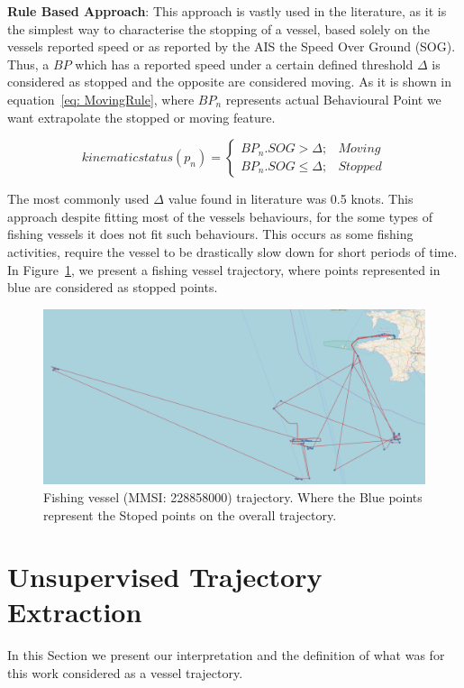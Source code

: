 \textbf{Rule Based Approach}:
This approach is vastly used in the literature, as it is the simplest way to characterise the stopping of a vessel, based solely on the vessels reported speed or as reported by the AIS the Speed Over Ground (SOG). Thus, a $BP$ which has a reported speed under a certain defined threshold $\Delta$ is considered as stopped and the opposite are considered moving. As it is shown in equation~\ref{eq: MovingRule}, where $BP_n$ represents actual Behavioural Point we want extrapolate the stopped or moving feature.

\begin{equation}
kinematic status(p_n) = \left\{\begin{matrix}
BP_n.SOG > \Delta; & Moving\\ 
BP_n.SOG \leq  \Delta; & Stopped
\end{matrix}\right.
\label{eq: MovingRule}
\end{equation}

The most commonly used $\Delta$ value found in literature was 0.5 knots.
This approach despite fitting most of the vessels behaviours, for the some types of fishing vessels it does not fit such behaviours. This occurs as some fishing activities, require the vessel to be drastically slow down for short periods of time.
In Figure~\ref{fig: 228858000}, we present a fishing vessel trajectory, where points represented in blue are considered as stopped points.   

\begin{figure}[H]
\centering
\includegraphics[width=\textwidth]{figures/Ch4/simplestopMoving228858000_cropped.png}
\caption{Fishing vessel (MMSI: 228858000) trajectory. Where the Blue points represent the Stoped points on the overall trajectory.}
\label{fig: 228858000}
\end{figure}

\section{Unsupervised Trajectory Extraction}
\label{section: 4 Unsupervised Trajectory Extraction}
In this Section we present our interpretation and the definition of what was for this work considered as a vessel trajectory. 


